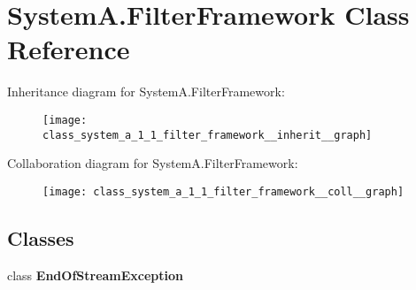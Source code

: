 \hypertarget{class_system_a_1_1_filter_framework}{}\section{System\+A.\+Filter\+Framework Class Reference}
\label{class_system_a_1_1_filter_framework}


Inheritance diagram for System\+A.\+Filter\+Framework\+:
\nopagebreak
\begin{figure}[H]
\begin{center}
\leavevmode
\texttt{[image: class\_system\_a\_1\_1\_filter\_framework\_\_inherit\_\_graph]}
\end{center}
\end{figure}


Collaboration diagram for System\+A.\+Filter\+Framework\+:
\nopagebreak
\begin{figure}[H]
\begin{center}
\leavevmode
\texttt{[image: class\_system\_a\_1\_1\_filter\_framework\_\_coll\_\_graph]}
\end{center}
\end{figure}
\subsection*{Classes}
\begin{DoxyCompactItemize}
\item 
class {\bfseries End\+Of\+Stream\+Exception}
\end{DoxyCompactItemize}
